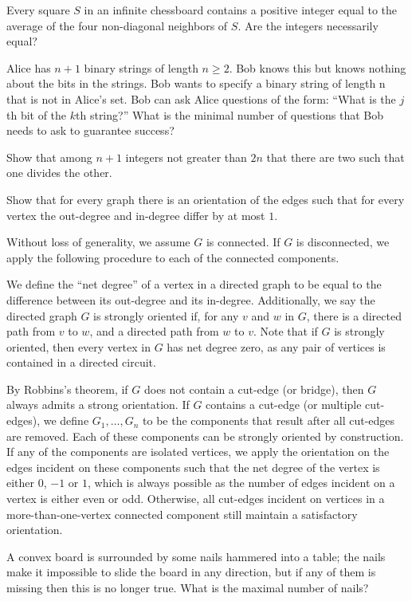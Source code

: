 \documentclass[10pt]{mypackage}
\begin{document}
\RaggedRight
\begin{problem}[Problem 1]
  Every square $S$ in an infinite chessboard contains a positive integer equal to the average of the four non-diagonal neighbors of $S$. Are the integers necessarily equal?
\end{problem}
\begin{problem}[Problem 2]
  Alice has $n+1$ binary strings of length $n\geq 2$. Bob knows this but knows nothing about the bits in the strings. Bob wants to specify a binary string of length n that is not in Alice’s set. Bob can ask Alice questions of the form: ``What is the $j$th bit of the $k$th string?'' What is the minimal number of questions that Bob needs to ask to guarantee success?
\end{problem}
\begin{problem}[Problem 3]
  Show that among $n+1$ integers not greater than $2n$ that there are two such that one divides the other.
\end{problem}
\begin{problem}[Problem 4]
Show that for every graph there is an orientation of the edges such that for every vertex the out-degree and in-degree differ by at most $1$.
\end{problem}
\begin{solution}
  Without loss of generality, we assume $G$ is connected. If $G$ is disconnected, we apply the following procedure to each of the connected components.\newline

  We define the ``net degree'' of a vertex in a directed graph to be equal to the difference between its out-degree and its in-degree. Additionally, we say the directed graph $G$ is strongly oriented if, for any $v$ and $w$ in $G$, there is a directed path from $v$ to $w$, and a directed path from $w$ to $v$. Note that if $G$ is strongly oriented, then every vertex in $G$ has net degree zero, as any pair of vertices is contained in a directed circuit.\newline

  By Robbins's theorem, if $G$ does not contain a cut-edge (or bridge), then $G$ always admits a strong orientation. If $G$ contains a cut-edge (or multiple cut-edges), we define $G_1,\dots,G_n$ to be the components that result after all cut-edges are removed. Each of these components can be strongly oriented by construction. If any of the components are isolated vertices, we apply the orientation on the edges incident on these components such that the net degree of the vertex is either $0$, $-1$ or $1$, which is always possible as the number of edges incident on a vertex is either even or odd. Otherwise, all cut-edges incident on vertices in a more-than-one-vertex connected component still maintain a satisfactory orientation.
\end{solution}

\begin{problem}[Problem 5]
  A convex board is surrounded by some nails hammered into a table; the nails make it impossible to slide the board in any direction, but if any of them is missing then this is no longer true. What is the maximal number of nails?
\end{problem}
\end{document}
